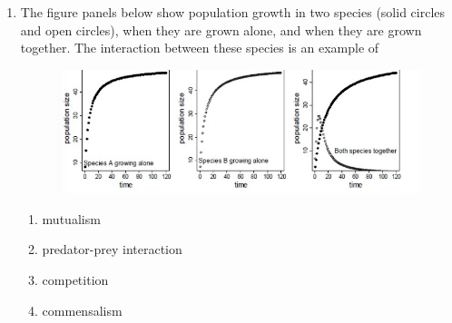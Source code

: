 \documentclass[journal,12pt,onecolumn]{IEEEtran}
\theoremstyle{remark}
\begin{document}
\begin{enumerate}
(Q) Intense aggression by the dominant female towards subordinates results in chronic stress, elevated stress hormone levels, and lowered rates of conception in subordinates

(R) When dispersal is costly, natural selection favours delayed dispersal of the young who instead help rear siblings, in return for continued residence on their natal territory

(S) Pregnant subordinate females are evicted from the group by the dominant female, and harsh conditions outside the group result in loss of body condition and increased risk of abortions
\begin{multicols}{4}
\begin{enumerate}
    
\item P and Q
\item P and R
\item Q and S
\item Q and R

    \end{enumerate}
    \end{multicols}
\hfill{(GATE EY 2015)}


\item 
The figure panels below show population growth in two species (solid circles and open circles), when they are grown alone, and when they are grown together. The interaction between these species is an example of
\begin{figure}[H]
    \centering
    \includegraphics[]{figs/Q.38.png}
    \caption{}
    \label{fig:4}
\end{figure}

\begin{multicols}{2}
\begin{enumerate}
\item mutualism
\item predator-prey interaction
\item competition
\item commensalism


\end{enumerate}
\end{multicols}
\end{enumerate}
\end{document}
